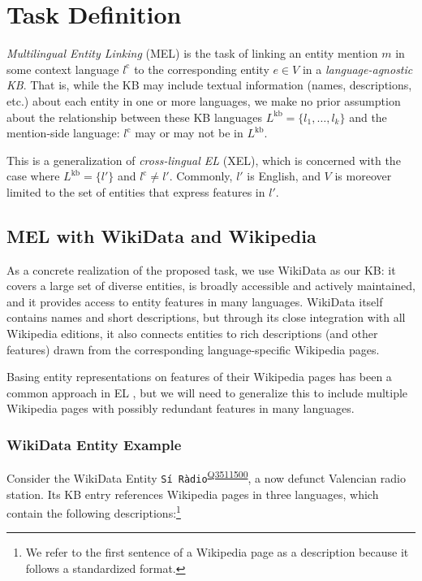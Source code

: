 \documentclass[11pt,a4paper]{article}
\newcommand{\entity}[1]{\texttt{#1}}
\newcommand{\ientity}[2]{\entity{#1}\textsuperscript{\href{https://www.wikidata.org/wiki/#2}{#2}}}
\begin{document}
\section{Task Definition}
\emph{Multilingual Entity Linking} (MEL) is the task of linking an entity mention $m$ in
some context language $l^{\textrm{c}}$ to the corresponding entity $e\in V$ in a \emph{language-agnostic KB}. That is, while the KB may include textual information (names, descriptions, etc.) about each entity in one or more languages, we make no prior assumption about the relationship between these KB languages $L^{\textrm{kb}}=\{l_1, \dots, l_k\}$ and the mention-side language: $l^{\textrm{c}}$ may or may not be in $L^{\textrm{kb}}$.

This is a generalization of \emph{cross-lingual EL} (XEL), which is concerned with the case 
where $L^{\textrm{kb}}=\{l'\}$ and $l^{\textrm{c}} \neq l'$.
Commonly, $l'$ is English, and $V$ is moreover limited to the set of entities that express features in $l'$.

\subsection{MEL with WikiData and Wikipedia}
As a concrete realization of the proposed task, we use WikiData \cite{vrandevcic2014wikidata} as our KB:
it covers a large set of diverse entities,
is broadly accessible and actively maintained,
and it provides access to entity features in many languages.
WikiData itself contains names and short descriptions,
but through its close integration with all Wikipedia editions,
it also connects entities to rich descriptions (and other features) drawn from the corresponding language-specific Wikipedia pages.

Basing entity representations on features of their Wikipedia pages has been a common approach 
in EL \cite[e.g.][]{sil-florian-2016-one,francis-landau-etal-2016-capturing,gillick-etal-2019-learning,wu2019zeroshot}, but we will need to generalize this to include multiple Wikipedia pages with possibly redundant features in many languages.

\subsubsection{WikiData Entity Example}\label{sec:description_example}
Consider the WikiData Entity \ientity{Sí Ràdio}{Q3511500}, a now defunct Valencian radio station. Its KB entry references Wikipedia pages in three languages, which contain the following descriptions:\footnote{We refer to the first sentence of a Wikipedia page as a description because it follows a standardized format.}
\end{document}
